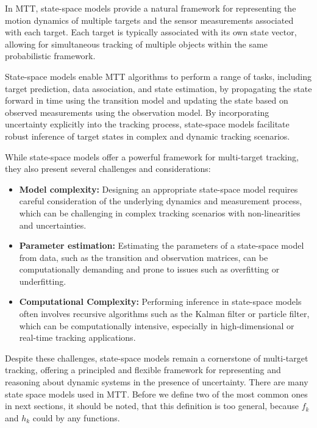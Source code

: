In MTT, state-space models provide a natural framework for representing the motion dynamics of multiple targets and the sensor measurements associated with each target. Each target is typically associated with its own state vector, allowing for simultaneous tracking of multiple objects within the same probabilistic framework.

State-space models enable MTT algorithms to perform a range of tasks, including target prediction, data association, and state estimation, by propagating the state forward in time using the transition model and updating the state based on observed measurements using the observation model. By incorporating uncertainty explicitly into the tracking process, state-space models facilitate robust inference of target states in complex and dynamic tracking scenarios.

While state-space models offer a powerful framework for multi-target tracking, they also present several challenges and considerations:
\begin{itemize}
    \item \textbf{Model complexity:} Designing an appropriate state-space model requires careful consideration of the
    underlying dynamics and measurement process, which can be challenging in complex tracking scenarios with non-linearities and uncertainties.
    \item \textbf{Parameter estimation:} Estimating the parameters of a state-space model from data, such as the transition and observation matrices, can be computationally demanding and prone to issues such as overfitting or underfitting.
    \item \textbf{Computational Complexity:} Performing inference in state-space models often involves recursive algorithms such as the Kalman filter or particle filter, which can be computationally intensive, especially in high-dimensional or real-time tracking applications.
\end{itemize}
Despite these challenges, state-space models remain a cornerstone of multi-target tracking, offering a principled and flexible framework for representing and reasoning about dynamic systems in the presence of uncertainty.
There are many state space models used in MTT. Before we define two of the most common ones in next sections, it
should be noted, that this definition is too general, because $f_k$ and $h_k$ could by any functions.

